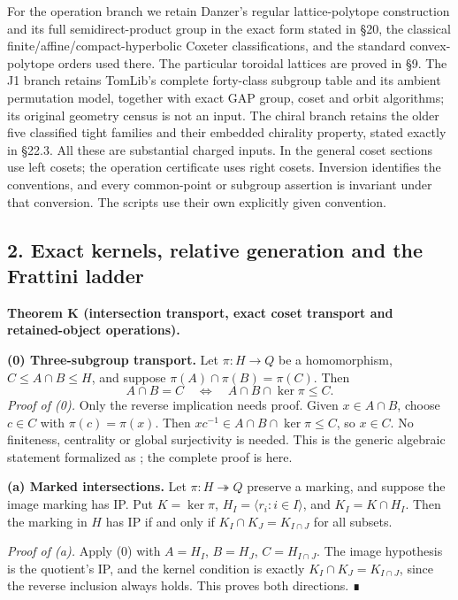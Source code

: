 \documentclass[
  10pt,
  letterpaper,
]{article}
\renewcommand{\texttt}[1]{{\ttfamily\seqsplit{#1}}}
\begin{document}
For the operation branch we retain Danzer's regular lattice-polytope
construction and its full semidirect-product group in the exact form
stated in §20, the classical finite/affine/compact-hyperbolic Coxeter
classifications, and the standard convex-polytope orders used there. The
particular toroidal lattices are proved in §9. The J1 branch retains
TomLib's complete forty-class subgroup table and its ambient permutation
model, together with exact GAP group, coset and orbit algorithms; its
original geometry census is not an input. The chiral branch retains the
older five classified tight families and their embedded chirality
property, stated exactly in §22.3. All these are substantial charged
inputs. In the general coset sections use left cosets; the operation
certificate uses right cosets. Inversion identifies the conventions, and
every common-point or subgroup assertion is invariant under that
conversion. The scripts use their own explicitly given convention.

\subsection{2. Exact kernels, relative generation and the Frattini
ladder}\label{exact-kernels-relative-generation-and-the-frattini-ladder}

\textbf{Theorem K (intersection transport, exact coset transport and
retained-object operations).}

\textbf{(0) Three-subgroup transport.} Let \(\pi:H\to Q\) be a
homomorphism, \(C\le A\cap B\le H\), and suppose
\(\pi(A)\cap\pi(B)=\pi(C)\). Then \[
 A\cap B=C\quad\Longleftrightarrow\quad A\cap B\cap\ker\pi\le C.
 \tag{K0}
\] \emph{Proof of (0).} Only the reverse implication needs proof. Given
\(x\in A\cap B\), choose \(c\in C\) with \(\pi(c)=\pi(x)\). Then
\(xc^{-1}\in A\cap B\cap\ker\pi\le C\), so \(x\in C\). No finiteness,
centrality or global surjectivity is needed. This is the generic
algebraic statement formalized as
\texttt{LeemansLift.intersection\_of\_image\_and\_kernel}; the complete
proof is here.

\textbf{(a) Marked intersections.} Let \(\pi:H\twoheadrightarrow Q\)
preserve a marking, and suppose the image marking has IP. Put
\(K=\ker\pi\), \(H_I=\langle r_i:i\in I\rangle\), and \(K_I=K\cap H_I\).
Then the marking in \(H\) has IP if and only if
\(K_I\cap K_J=K_{I\cap J}\) for all subsets.

\emph{Proof of (a).} Apply (0) with \(A=H_I\), \(B=H_J\),
\(C=H_{I\cap J}\). The image hypothesis is the quotient's IP, and the
kernel condition is exactly \(K_I\cap K_J=K_{I\cap J}\), since the
reverse inclusion always holds. This proves both directions. ∎
\end{document}
